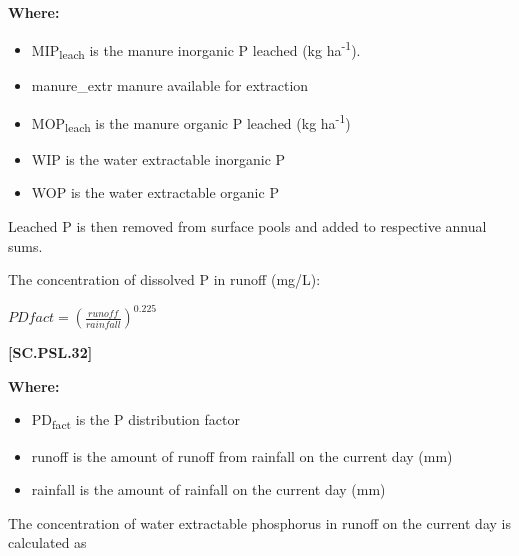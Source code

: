         \textbf{Where:}
            
        \begin{itemize}
            \item MIP\textsubscript{leach} is the manure inorganic P leached (kg ha\textsuperscript{-1}). 
            \item manure\_{extr} manure available for extraction
            \item MOP\textsubscript{leach} is the manure organic P leached (kg ha\textsuperscript{-1})
            \item WIP is the water extractable inorganic P	
            \item WOP is the water extractable organic P
        \end{itemize}
        \vspace{0.5cm}

Leached P is then removed from surface pools and added to respective annual sums.
        \vspace{0.2cm}
        
The concentration of dissolved P in runoff (mg/L):
\vspace{0.5cm}

        
    \begin{center}
\(PD fact= (\frac{runoff}{rainfall})^{0.225}	\)

    \end{center}
        \vspace{0.5cm} 
    
            {\raggedleft \textbf{[SC.PSL.32]}\par}
            \vspace{0.5cm}

        \textbf{Where:}
            
        \begin{itemize}
            \item PD\textsubscript{fact} is the P distribution factor
            \item runoff is the amount of runoff from rainfall on the current day (mm)
            \item rainfall is the amount of rainfall on the current day (mm)
        \end{itemize}
        \vspace{0.5cm}

The concentration of water extractable phosphorus in runoff on the current day is calculated as
\vspace{0.5cm}
        
